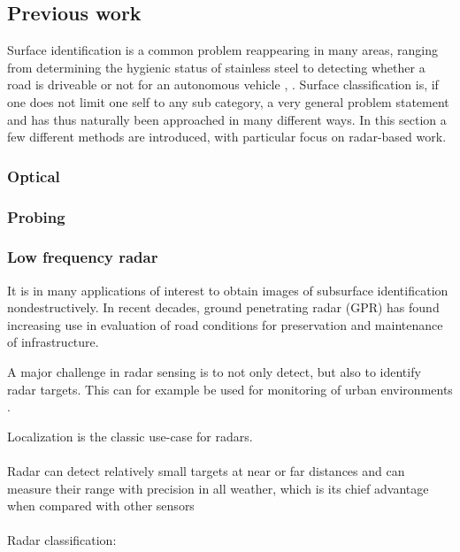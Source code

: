 \subsection{Previous work}

Surface identification is a common problem reappearing in many areas, ranging from determining the hygienic status of stainless steel \citep{jullien_bénézech_carpentier_lebret_faille_2003} to detecting whether a road is driveable or not for an autonomous vehicle \citep{guo_gerasimov_poulton_2006}, \citep{bystrov_2016}. Surface classification is, if one does not limit one self to any sub category, a very general problem statement and has thus naturally been approached in many different ways. In this section a few different methods are introduced, with particular focus on radar-based work. 

\subsubsection{Optical}

\subsubsection{Probing}

\subsubsection{Low frequency radar}

It is in many applications of interest to obtain images of subsurface identification nondestructively. In recent decades, ground penetrating radar (GPR) has found increasing use in evaluation of road conditions \citep{solla_gonzález-jorge_varela_lorenzo_2013} for preservation and maintenance of infrastructure.


A major challenge in radar sensing is to not only detect, but also to identify radar targets. This can for example be used for monitoring of urban environments \citep{harter_kowalewski_sit_jalilvand_ziroff_zwick_2014}.


Localization is the classic use-case for radars. 
\\ \\
 Radar  can detect relatively small targets at near or far distances and can measure their range with  precision  in  all weather,  which is  its chief  advantage when compared with other  sensors \citep{skolnik_2009}
\\ \\
Radar classification: 


